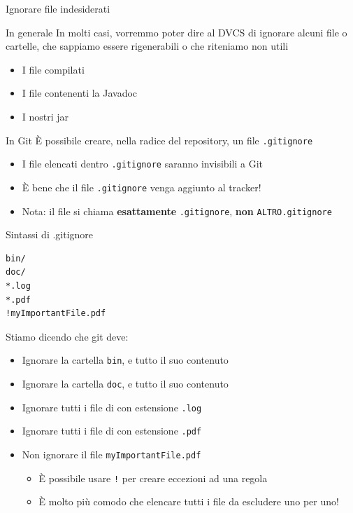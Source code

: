 \documentclass[presentation]{beamer}
\begin{document}
\begin{frame}{Ignorare file indesiderati}
	\begin{block}{In generale}
		In molti casi, vorremmo poter dire al DVCS di ignorare alcuni file o cartelle, che sappiamo essere rigenerabili o che riteniamo non utili
		\begin{itemize}
			\item I file compilati
			\item I file contenenti la Javadoc
			\item I nostri jar
		\end{itemize}
	\end{block}
	\begin{block}{In Git}
		È possibile creare, nella radice del repository, un file \texttt{.gitignore}
		\begin{itemize}
			\item I file elencati dentro \texttt{.gitignore} saranno invisibili a Git
			\item È bene che il file \texttt{.gitignore} venga aggiunto al tracker!
			\item Nota: il file si chiama \textbf{esattamente} \texttt{.gitignore}, \textbf{non} \texttt{ALTRO.gitignore}
		\end{itemize}
	\end{block}
	\begin{block}{Sintassi di .gitignore}
		\begin{Verbatim}[fontsize=\scriptsize]
bin/
doc/
*.log
*.pdf
!myImportantFile.pdf
		\end{Verbatim}
		Stiamo dicendo che git deve:
		\begin{itemize}
			\item Ignorare la cartella \texttt{bin}, e tutto il suo contenuto
			\item Ignorare la cartella \texttt{doc}, e tutto il suo contenuto
			\item Ignorare tutti i file di con estensione \texttt{.log}
			\item Ignorare tutti i file di con estensione \texttt{.pdf}
			\item Non ignorare il file \texttt{myImportantFile.pdf}
			\begin{itemize}
				\item È possibile usare \texttt{!} per creare eccezioni ad una regola
				\item È molto più comodo che elencare tutti i file da escludere uno per uno!
			\end{itemize}

\end{itemize}
\end{block}
\end{frame}
\end{document}
